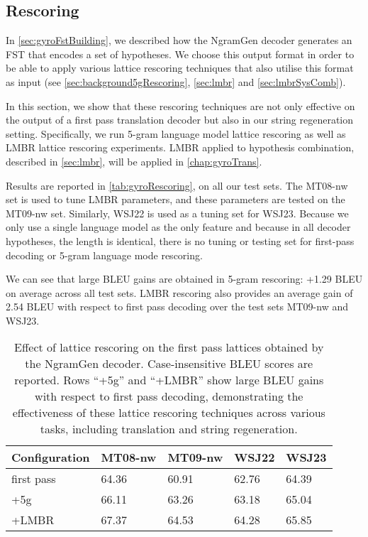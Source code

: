 \subsection{Rescoring}
\label{gyro:rescoring}

In \autoref{sec:gyroFstBuilding}, we described how the NgramGen decoder
generates an FST that encodes a set of hypotheses.
We choose this output format in order to be able to apply
various lattice rescoring techniques that also utilise this format
as input (see \autoref{sec:background5gRescoring}, \autoref{sec:lmbr}
and \autoref{sec:lmbrSysComb}).

In this section, we show that these rescoring techniques
are not only effective on the output of a first pass translation decoder
but also in our string regeneration setting.
Specifically, we run 5-gram language model lattice rescoring as well
as LMBR lattice rescoring experiments. LMBR applied to hypothesis combination,
described in \autoref{sec:lmbr}, will be applied in \autoref{chap:gyroTrans}.

Results are reported in \autoref{tab:gyroRescoring}, on all our test sets.
The MT08-nw set is used to tune LMBR parameters, and these parameters are
tested on the MT09-nw set. Similarly, WSJ22 is used as a tuning set for WSJ23.
Because we only use a single language model as the only feature and because in all decoder
hypotheses, the length is identical, there is no tuning or testing set
for first-pass decoding or 5-gram language mode rescoring.

We can see that large BLEU gains are obtained in 5-gram rescoring: +1.29 BLEU
on average across all test sets. LMBR rescoring also provides
an average gain of 2.54 BLEU with respect to first pass decoding over the
test sets MT09-nw and WSJ23.
%
\begin{table}
  \begin{center}
  \begin{tabular}{l|l|l|l|l}
    Configuration & MT08-nw & MT09-nw & WSJ22 & WSJ23 \\
    \hline
    first pass & 64.36 & 60.91 & 62.76 & 64.39 \\
    +5g       & 66.11 & 63.26 & 63.18 & 65.04 \\
    +LMBR     & 67.37 & 64.53 & 64.28 & 65.85 \\
  \end{tabular}
  \caption{Effect of lattice rescoring on the first pass lattices obtained
    by the NgramGen decoder. Case-insensitive BLEU scores are reported.
    Rows ``+5g'' and ``+LMBR'' show large BLEU gains with respect to
    first pass decoding, demonstrating the effectiveness of these lattice
    rescoring techniques across various tasks, including translation and
    string regeneration.}
  \label{tab:gyroRescoring}
  \end{center}
\end{table}

